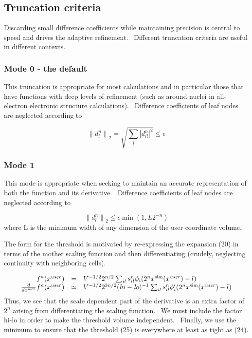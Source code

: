 \documentclass[letterpaper]{article}
\begin{document}
\subsection{Truncation criteria}
\label{ref:sectruncmodes}Discarding small difference coefficients while maintaining precision is central to speed and
drives the adaptive refinement. \ Different truncation criteria are useful in different contexts.

\subsubsection[Mode 0 {}- the default]{\rmfamily Mode 0 - the default}
This truncation is appropriate for most calculations and in particular those that have functions with deep levels of
refinement (such as around nuclei in all-electron electronic structure calculations). \ Difference coefficients of leaf
nodes are neglected according to 

\begin{equation}\label{seq:refText23}
\left\|d_{l}^{n}\right\|_{2}=\sqrt{\sum _{i}\left|d_{il}^{n}\right|^{2}}\le \epsilon 
\end{equation}
\subsubsection{Mode 1}
This mode is appropriate when seeking to maintain an accurate representation of both the function and its derivative.
\ Difference coefficients of leaf nodes are neglected according to 

\begin{equation}\label{seq:refText24}
\left\|d_{l}^{n}\right\|_{2}\le \epsilon \operatorname{min}(1,L2^{-n})
\end{equation}
where L is the minimum width of any dimension of the user coordinate volume.

The form for the threshold is motivated by re-expressing the expansion (20) in terms of the mother scaling function and
then differentiating (crudely, neglecting continuity with neighboring cells). 

\begin{equation}
\begin{matrix}\hfill f^{n}(x^{\mathrm{{\mathit{user}}}})&\text{=}&V^{-1/2}2^{n/2}\sum _{il}s_{il}^{n}\phi
_{i}(2^{n}x^{\mathrm{{sim}}}(x^{\mathrm{{\mathit{user}}}})-l)\hfill\null \\\hfill
\frac{d}{dx^{\mathrm{{\mathit{user}}}}}f^{n}(x^{\mathrm{{\mathit{user}}}})&\simeq
&V^{-1/2}2^{3n/2}(\mathrm{{\mathit{hi}}}-\mathrm{{\mathit{lo}}})^{-1}\sum _{il}s_{il}^{n}\phi
'_{i}(2^{n}x^{\mathrm{{sim}}}(x^{\mathrm{{\mathit{user}}}})-l)\hfill\null \end{matrix}
\end{equation}
Thus, we see that the scale dependent part of the derivative is an extra factor of  $2^{n}$ arising from differentiating
the scaling function. \ We must include the factor hi-lo in order to make the threshold volume independent. \ Finally,
we use the minimum to ensure that the threshold (25) is everywhere at least as tight as (24).
\end{document}
